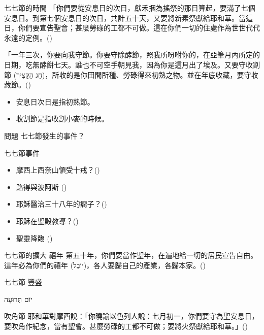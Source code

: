\documentclass{beamer}
\newcommand{\topic}[1]{
  \begin{frame}
    \centering
    \vspace*{1cm}
    {\fontsize{40}{48}\selectfont #1\par}
    \vfill
  \end{frame}
}
\newcommand{\question}[1]{
  \begin{frame}{問題}
    \centering
    \vspace*{1cm}
    \huge #1？\par
    \vfill
  \end{frame}
}
\newcommand{\conclusion}[2]{
  \begin{frame}
    \centering
    \vspace*{1cm}
    {\fontsize{40}{48}\selectfont #1 \textemdash #2\par}
    \vfill
  \end{frame}
}
\newcommand{\parvspace}{\par\vspace{0.5em}}
\begin{document}
\begin{frame}{七七節的時間}
  「你們要從\alert{安息日的次日}，獻禾捆為搖祭的那日算起，要\alert{滿了七個安息日}。到\alert{第七個安息日的次日，共計五十天}，又要將新素祭獻給耶和華。\textellipsis{}當這日，你們要宣告聖會；\alert{甚麼勞碌的工都不可做}。這在你們一切的住處作為世世代代永遠的定例。()\parvspace
  「一年三次，你要向我守節。你要守除酵節，照我所吩咐你的，在亞筆月內所定的日期，吃無酵餅七天。誰也不可空手朝見我，因為你是這月出了埃及。又要守\alert{收割節 (\texthebrew{חַג הַקָּצִיר})}，所收的是你田間所種、勞碌得來初熟之物。並在年底收藏，要守收藏節。()\parvspace
  \begin{itemize}
    \item 安息日次日是指初熟節。
    \item 收割節是指收割小麥的時候。
  \end{itemize}
\end{frame}

\question{七七節發生的事件}

\begin{frame}{七七節事件}
  \begin{itemize}
    \item 摩西上西奈山領受十戒？()\parencite{TenCommandmentsOnShavuot}
    \item 路得與波阿斯 ()
    \item 耶穌醫治三十八年的瘸子？()\parencite{YeshuaHealsInShavuot}
    \item 耶穌在聖殿教導？()\parencite{ YeshuaTeachesInShavuot}
    \item 聖靈降臨 ()
  \end{itemize}
\end{frame}

\begin{frame}{七七節的擴大 \textemdash 禧年}
  第五十年，你們要當作\alert{聖年}，在遍地給一切的居民\alert{宣告自由}。這年必為你們的禧年 (\texthebrew{יוֹבֵל})，各人要\alert{歸自己的產業}，\alert{各歸本家}。()
\end{frame}

\conclusion{七七節}{豐盛}

\topic{\texthebrew{יוֹם תְּרוּעָה}}

\begin{frame}{吹角節}
  耶和華對摩西說：「你曉諭以色列人說：\alert{七月初一}，你們要守為\alert{聖安息日}，要吹角作紀念，當有聖會。甚麼勞碌的工都不可做；要將火祭獻給耶和華。」()\parvspace
\end{frame}
\end{document}

